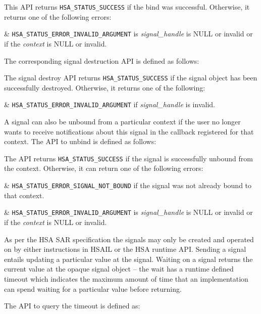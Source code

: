 

This API returns \texttt{HSA\_STATUS\_SUCCESS} if the bind was
successful. Otherwise, it returns one of the following errors:

\begin{easylist}
& \texttt{HSA\_STATUS\_ERROR\_INVALID\_ARGUMENT} is {\itshape
signal\_handle} is NULL or invalid or if the {\itshape context} is
NULL or invalid. 
\end{easylist}

The corresponding signal destruction API is defined as follows:


The signal destroy API returns \texttt{HSA\_STATUS\_SUCCESS} if the
signal object has been successfully destroyed. Otherwise, it returns
one of the following:

\begin{easylist}
& \texttt{HSA\_STATUS\_ERROR\_INVALID\_ARGUMENT} if {\itshape
signal\_handle} is invalid.
\end{easylist}

A signal can also be unbound from a particular context if the user
no longer wants to receive notifications about this signal in the
callback registered for that context. The API to unbind is defined
as follows:



The API returns \texttt{HSA\_STATUS\_SUCCESS} if the signal is
successfully unbound from the context. Otherwise, it can return one
of the following errors:

\begin{easylist}
& \texttt{HSA\_STATUS\_ERROR\_SIGNAL\_NOT\_BOUND} if the signal was
not already bound to that context.

& \texttt{HSA\_STATUS\_ERROR\_INVALID\_ARGUMENT} is {\itshape
signal\_handle} is NULL or invalid or if the {\itshape context} is
NULL or invalid. 
\end{easylist}

As per the HSA SAR specification the signals may only be created and
operated on by either instructions in HSAIL or the HSA runtime API.
Sending a signal entails updating a particular value at the signal.
Waiting on a signal returns the current value at the opaque signal
object -- the wait has a runtime defined timeout which indicates the
maximum amount of time that an implementation can spend waiting for
a particular value before returning. 

The API to query the timeout is defined as:

